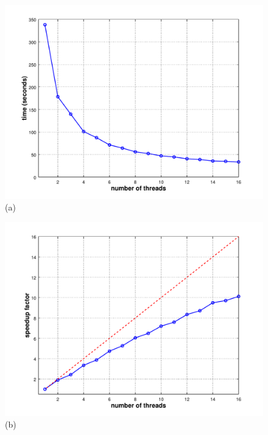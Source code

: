 \begin{itemize}
\begin{enumerate}[{$\cdot$}]
\begin{figure}[t!]
\centering
\begin{minipage}{\textwidth}
  \centering
  \begin{minipage}{0.5\textwidth}
    \centering
    \includegraphics[width=1.1\textwidth]{plot1.pdf}\\
    {(a)}
  \end{minipage}%
  \begin{minipage}{0.5\textwidth}
    \centering
    \includegraphics[width=1.1\textwidth]{plot2.pdf}\\
    {(b)}
  \end{minipage}
\end{minipage}

\end{figure}
\end{enumerate}
\end{itemize}
